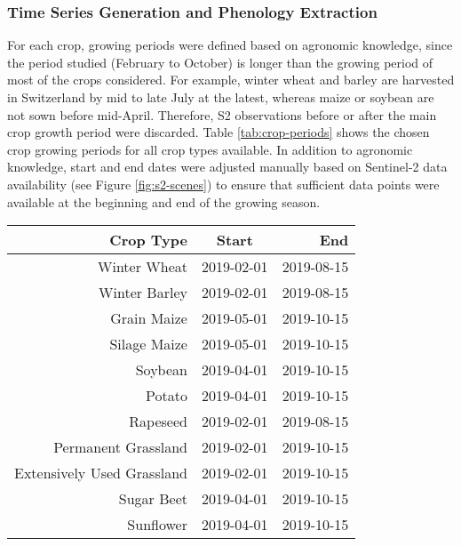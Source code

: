 \subsubsection{Time Series Generation and Phenology Extraction}
\label{subsubsec:time-series}

For each crop, growing periods were defined based on agronomic knowledge, since the period studied (February to October) is longer than the growing period of most of the crops considered. For example, winter wheat and barley are harvested in Switzerland by mid to late July at the latest, whereas maize or soybean are not sown before mid-April. Therefore, \gls{S2} observations before or after the main crop growth period were discarded. Table \ref{tab:crop-periods} shows the chosen crop growing periods for all crop types available. In addition to agronomic knowledge, start and end dates were adjusted manually based on Sentinel-2 data availability (see Figure \ref{fig:s2-scenes}) to ensure that sufficient data points were available at the beginning and end of the growing season.

\begin{table*}
\centering
\caption{Key crop growth periods defined based on agronomic knowledge to constrain the temporal range considered per crop type between a start and end date (YYYY-MM-DD).}
\begin{tabular*}{\textwidth}{@{\extracolsep{\fill}}rcr}
Crop Type                     & Start      & End        \\
\hline
Winter Wheat              & 2019-02-01 & 2019-08-15 \\
Winter Barley             & 2019-02-01 & 2019-08-15 \\
Grain Maize               & 2019-05-01 & 2019-10-15 \\
Silage Maize              & 2019-05-01 & 2019-10-15 \\
Soybean                   & 2019-04-01 & 2019-10-15 \\
Potato                    & 2019-04-01 & 2019-10-15 \\
Rapeseed                  & 2019-02-01 & 2019-08-15 \\
Permanent Grassland        & 2019-02-01 & 2019-10-15 \\
Extensively Used Grassland & 2019-02-01 & 2019-10-15 \\
Sugar Beet                & 2019-04-01 & 2019-10-15 \\
Sunflower                 & 2019-04-01 & 2019-10-15 \\
\hline
\end{tabular*}
\label{tab:crop-periods}
\end{table*}

